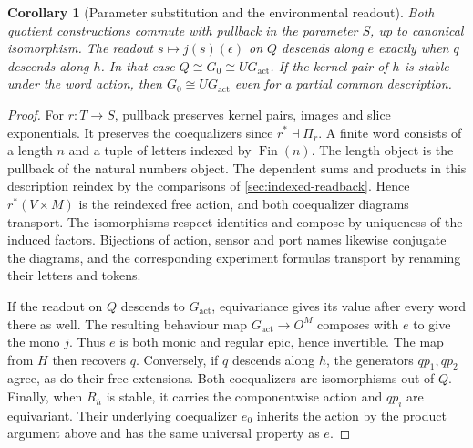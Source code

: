 \documentclass[11pt,a4paper]{article}
\newtheorem{corollary}[corollary]{Corollary}
\theoremstyle{definition}
\theoremstyle{remark}\newaliascnt{remark}{theorem}
\numberwithin{equation}{section}
\begin{document}
\begin{corollary}[Parameter substitution and the environmental readout]\label{cor:ground-output}
Both quotient constructions commute with pullback in the parameter $S$, up to canonical isomorphism. The readout $s\mapsto j(s)(\epsilon)$ on $Q$ descends along $e$ exactly when $q$ descends along $h$. In that case $Q\cong G_0\cong UG_{\mathrm{act}}$. If the kernel pair of $h$ is stable under the word action, then $G_0\cong UG_{\mathrm{act}}$ even for a partial common description.
\end{corollary}
\begin{proof}
For $r:T\to S$, pullback preserves kernel pairs, images and slice exponentials. It preserves the coequalizers since $r^*\dashv\Pi_r$. A finite word consists of a length $n$ and a tuple of letters indexed by $\operatorname{Fin}(n)$. The length object is the pullback of the natural numbers object. The dependent sums and products in this description reindex by the comparisons of \cref{sec:indexed-readback}. Hence $r^*(V\times M)$ is the reindexed free action, and both coequalizer diagrams transport. The isomorphisms respect identities and compose by uniqueness of the induced factors. Bijections of action, sensor and port names likewise conjugate the diagrams, and the corresponding experiment formulas transport by renaming their letters and tokens.

If the readout on $Q$ descends to $G_{\mathrm{act}}$, equivariance gives its value after every word there as well. The resulting behaviour map $G_{\mathrm{act}}\to O^M$ composes with $e$ to give the mono $j$. Thus $e$ is both monic and regular epic, hence invertible. The map from $H$ then recovers $q$. Conversely, if $q$ descends along $h$, the generators $qp_1,qp_2$ agree, as do their free extensions. Both coequalizers are isomorphisms out of $Q$. Finally, when $R_h$ is stable, it carries the componentwise action and $qp_i$ are equivariant. Their underlying coequalizer $e_0$ inherits the action by the product argument above and has the same universal property as $e$.
\end{proof}
\end{document}
